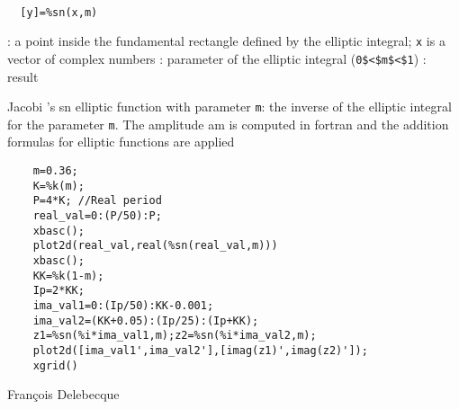 
\begin{mandesc}
   \\ %
\end{mandesc}
\begin{calling_sequence}
\begin{verbatim}
  [y]=%sn(x,m)  
\end{verbatim}
\end{calling_sequence}
\begin{parameters}
  \begin{varlist}
    : a point inside the fundamental rectangle  defined by the elliptic integral; \verb!x! is a vector of complex numbers
    : parameter of the elliptic integral (\verb!0$<$m$<$1!)
    : result
  \end{varlist}
\end{parameters}
\begin{mandescription}
  Jacobi 's sn elliptic function with parameter \verb!m!: the inverse 
  of the elliptic integral for the parameter \verb!m!.
  The amplitude am is computed in fortran and 
  the addition formulas for elliptic functions are applied
\end{mandescription}
\begin{examples}
  \begin{Verbatim}
    m=0.36;
    K=%k(m);
    P=4*K; //Real period
    real_val=0:(P/50):P;
    xbasc();
    plot2d(real_val,real(%sn(real_val,m)))
    xbasc();
    KK=%k(1-m);
    Ip=2*KK;
    ima_val1=0:(Ip/50):KK-0.001;
    ima_val2=(KK+0.05):(Ip/25):(Ip+KK);
    z1=%sn(%i*ima_val1,m);z2=%sn(%i*ima_val2,m);
    plot2d([ima_val1',ima_val2'],[imag(z1)',imag(z2)']);
    xgrid()
  \end{Verbatim}
\end{examples}
\begin{manseealso}
     
\end{manseealso}
\begin{authors}
  Fran\c{c}ois  Delebecque  
\end{authors}
